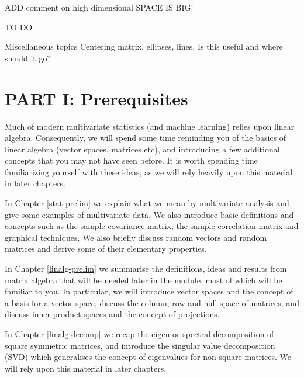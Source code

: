 \documentclass[]{book}
\theoremstyle{definition}
\theoremstyle{definition}
\theoremstyle{definition}
\theoremstyle{remark}
\begin{document}
ADD comment on high dimensional SPACE IS BIG!

TO DO

Miscellaneous topics Centering matrix, ellipses, lines. Is this useful and where should it go?

\hypertarget{part-i-prerequisites}{%
\chapter*{PART I: Prerequisites}\label{part-i-prerequisites}}

Much of modern multivariate statistics (and machine learning) relies upon linear algebra. Consequently, we will spend some time reminding you of the basics of linear algebra (vector spaces, matrices etc), and introducing a few additional concepts that you may not have seen before. It is worth spending time familiarizing yourself with these ideas, as we will rely heavily upon this material in later chapters.

In Chapter \ref{stat-prelim} we explain what we mean by multivariate analysis and give some examples of multivariate data. We also introduce basic definitions and concepts such as the sample covariance matrix, the sample correlation matrix and graphical techniques. We also briefly discuss random vectors and random matrices and derive some of their elementary properties.

In Chapter \ref{linalg-prelim} we summarise the definitions, ideas and results from matrix algebra that will be needed later in the module, most of which will be familiar to you. In particular, we will introduce vector spaces and the concept of a basis for a vector space, discuss the column, row and null space of matrices, and discuss inner product spaces and the concept of projections.

In Chapter \ref{linalg-decomp} we recap the eigen or spectral decomposition of square symmetric matrices, and introduce the singular value decomposition (SVD) which generalises the concept of eigenvalues for non-square matrices. We will rely upon this material in later chapters.
\end{document}
